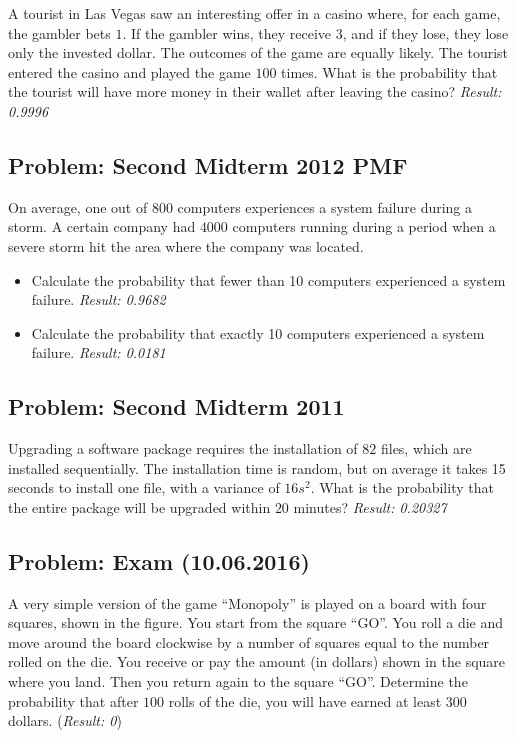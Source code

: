 \documentclass[a4paper, 12pt]{article}
\begin{document}
A tourist in Las Vegas saw an interesting offer in a casino where, for each game, the gambler bets $1$. If the gambler wins, they receive $3$, and if they lose, they lose only the invested dollar. The outcomes of the game are equally likely. The tourist entered the casino and played the game $100$ times. What is the probability that the tourist will have more money in their wallet after leaving the casino?
\textit{Result: {0.9996}}


\subsection{Problem: Second Midterm 2012 PMF}

On average, one out of $800$ computers experiences a system failure during a storm. A certain company had $4000$ computers running during a period when a severe storm hit the area where the company was located.
\begin{itemize}
  \item [a)] Calculate the probability that fewer than 10 computers experienced a system failure.
\textit{Result: {0.9682}}
\item [b)] Calculate the probability that exactly 10 computers experienced a system failure.
\textit{Result: {0.0181}}

\end{itemize}



\subsection{Problem: Second Midterm 2011}
Upgrading a software package requires the installation of $82$ files, which are installed sequentially. The installation time is random, but on average it takes 15 seconds to install one file, with a variance of $16 s^2$. What is the probability that the entire package will be upgraded within $20$ minutes?
\textit{Result: {0.20327}}



\subsection{Problem: Exam (10.06.2016)}

A very simple version of the game “Monopoly” is played on a board with four squares, shown in the figure. You start from the square “GO”. You roll a die and move around the board clockwise by a number of squares equal to the number rolled on the die. You receive or pay the amount (in dollars) shown in the square where you land. Then you return again to the square “GO”.
Determine the probability that after $100$ rolls of the die, you will have earned at least $300$ dollars. (\textit{Result: {0}})
\end{document}

